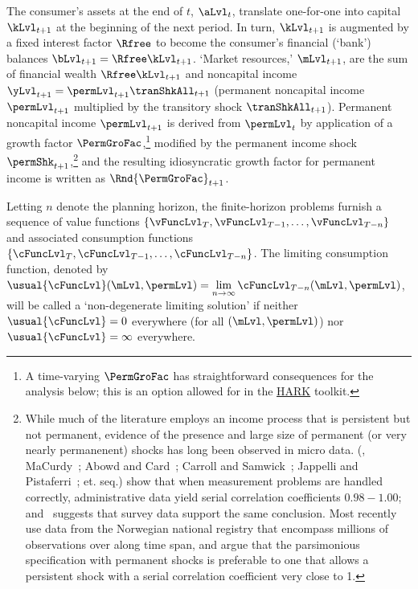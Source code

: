 \documentclass[BufferStockTheory]{subfiles}
\begin{document}

%
The consumer's assets at the end of $t$, $\aLvl_{t}$, translate one-for-one into capital $\kLvl_{t+1}$ at the beginning of the next period.
In turn, $\kLvl_{t+1}$ is augmented by a fixed interest factor $\Rfree$ to become the consumer's financial (`bank') balances $\bLvl_{t+1} = \Rfree \kLvl_{t+1}$.  `Market resources,' $\mLvl_{t+1}$,  are the sum of financial wealth $\Rfree \kLvl_{t+1}$ and noncapital income $\yLvl_{t+1}=\permLvl_{t+1}\tranShkAll_{t+1}$ (permanent noncapital income $\permLvl_{t+1}$ multiplied by the transitory shock $\tranShkAll_{t+1}$).
Permanent noncapital income $\permLvl_{t+1}$ is derived from $\permLvl_{t}$ by application of a growth factor $\PermGroFac$,\footnote{A time-varying $\PermGroFac$ has straightforward consequences for the analysis below; this is an option allowed for in the \href{https://econ-ark.org}{HARK} toolkit.} modified by the permanent income shock $\permShk_{t+1}$,\footnote{While much of the literature employs an income process that is persistent but not permanent, evidence of the presence and large size of permanent (or very nearly permanenent) shocks has long been observed in micro data.
  (\cite{lwComponents}, MaCurdy~\citeyearpar{macurdyTimeseries}; Abowd and Card~\citeyearpar{acCovariance}; Carroll and Samwick~\citeyearpar{csNature}; Jappelli and Pistaferri~\citeyear{jpCins}; et. seq.)
  \cite{dhmImproving} show that when measurement problems are handled correctly, administrative data yield serial correlation coefficients $0.98-1.00$; and~\cite{dmHowMuch} suggests that survey data support the same conclusion.  Most recently \cite{crawleyParsimonious} use data from the Norwegian national registry that encompass millions of observations over along time span, and argue that the parsimonious specification with permanent shocks is preferable to one that allows a persistent shock with a serial correlation coefficient very close to 1.
  } and the resulting idiosyncratic growth factor for permanent income is written as $\Rnd{\PermGroFac}_{t+1}$.

Letting $n$ denote the planning horizon, the finite-horizon problems furnish a sequence of value functions $\{\vFuncLvl_{T},\vFuncLvl_{T-1},\ldots,\vFuncLvl_{T-n}\}$ and associated consumption functions $\{\cFuncLvl_{T},\cFuncLvl_{T-1},\ldots,\cFuncLvl_{T-n}\}$.
The limiting consumption function, denoted by $\usual{\cFuncLvl}(\mLvl,\permLvl) = \lim\limits_{n \rightarrow \infty} \cFuncLvl_{T-n}(\mLvl,\permLvl)$, will be called a `non-degenerate limiting solution' if  neither $\usual{\cFuncLvl}=0$ everywhere (for all $(\mLvl,\permLvl)$) nor $\usual{\cFuncLvl}=\infty$ everywhere.
\end{document}
